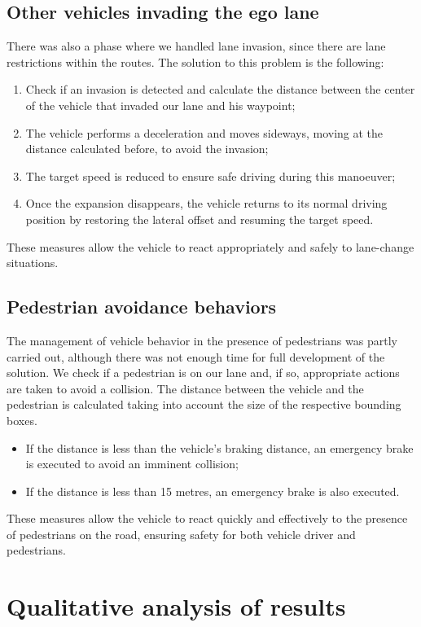 \documentclass{article}
\begin{document}
\subsection{Other vehicles invading the ego lane}
There was also a phase where we handled lane invasion, since there are lane restrictions within the routes. 
The solution to this problem is the following:
\begin{enumerate}
    \item Check if an invasion is detected and calculate the distance between the center of the vehicle that invaded our lane and his waypoint;
    \item The vehicle performs a deceleration and moves sideways, moving at the distance calculated before, to avoid the invasion; 
    \item The target speed is reduced to ensure safe driving during this manoeuver;
    \item Once the expansion disappears, the vehicle returns to its normal driving position by restoring the lateral offset and resuming the target speed. 
\end{enumerate}
These measures allow the vehicle to react appropriately and safely to lane-change situations.

\subsection{Pedestrian avoidance behaviors}
The management of vehicle behavior in the presence of pedestrians was partly carried out, 
although there was not enough time for full development of the solution. 
We check if a pedestrian is on our lane and, if so, appropriate actions are taken to avoid a collision. 
The distance between the vehicle and the pedestrian is calculated taking into account the size of the 
respective bounding boxes.  
\begin{itemize}
    \item If the distance is less than the vehicle's braking distance, an emergency brake is executed to avoid an imminent collision;
    \item If the distance is less than 15 metres, an emergency brake is also executed. 
\end{itemize}
These measures allow the vehicle to react quickly and effectively to the presence of pedestrians on the road, 
ensuring safety for both vehicle driver and pedestrians.

\section{Qualitative analysis of results}
\end{document}
